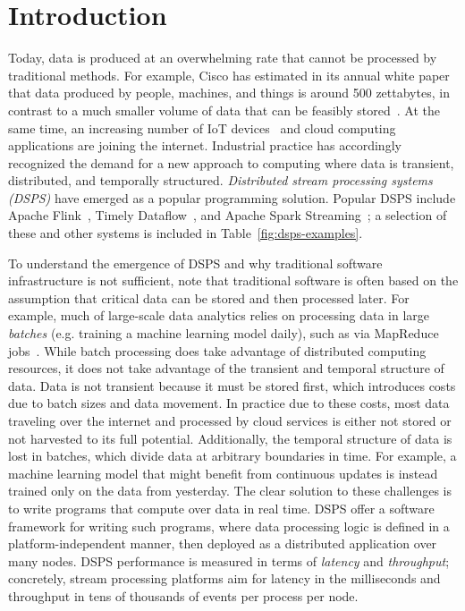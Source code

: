 \section{Introduction}
\label{sec:intro}

Today, data is produced at an overwhelming rate
that cannot be processed by traditional methods.
For example, Cisco has estimated in its annual white paper
that data produced by people, machines, and things
is around 500 zettabytes, in contrast to a much smaller volume
of data that can be feasibly stored~\cite{index2018forecast}.
At the same time, an increasing number of IoT devices~\cite{shi2016edge, ashton2009internet} and cloud computing applications
are joining the internet.
Industrial practice has accordingly recognized the demand
for a new approach to computing
where data is transient, distributed, and temporally structured.
\emph{Distributed stream processing systems (DSPS)} have emerged as a popular
programming solution.
Popular DSPS include
Apache Flink~\cite{Flink,Flink2015},
Timely Dataflow~\cite{Timely,Naiad2013},
and Apache Spark Streaming~\cite{SparkStreaming,Spark2013};
a selection of these and other systems is included in Table~\ref{fig:dsps-examples}.

To understand the emergence of DSPS and why traditional software infrastructure
is not sufficient, note that traditional software
is often based on the assumption that
critical data can be stored and then processed later.
For example,
much of large-scale data analytics relies on processing data in large
\emph{batches} (e.g. training a machine learning model daily),
such as via MapReduce jobs~\cite{dean2008mapreduce}.
While batch processing
does take advantage of distributed computing resources,
it does not take advantage of the transient and temporal structure of data.
Data is not transient because it must be stored first,
which introduces costs due to batch sizes and data movement.
In practice due to these costs, most data traveling over the internet
and processed by cloud services is either not stored or not harvested to its full potential.
Additionally, the temporal structure of data is lost in batches, which divide
data at arbitrary boundaries in time.
For example, a machine learning model that might benefit from continuous updates is instead trained only on the data from yesterday.
The clear solution to these challenges is to write programs that compute over data in real time.
DSPS offer a software framework for writing such programs, where data processing logic is defined in a platform-independent manner,
then deployed as a distributed application over many nodes.
DSPS performance is measured in terms of \emph{latency} and \emph{throughput};
concretely, stream processing platforms aim for latency in the milliseconds and throughput in tens of thousands of events per process per node.

